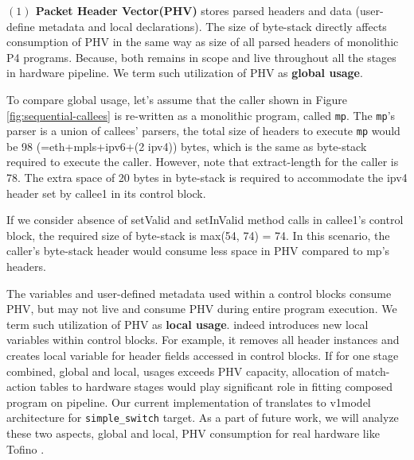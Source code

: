 \documentclass[letterpaper,twocolumn,10pt]{article}
\begin{document}
\textbf{$(1)$ Packet Header Vector(PHV)} stores parsed headers and data (user-define metadata and local declarations).
The size of byte-stack directly affects consumption of PHV in the same way as size of all parsed headers of monolithic P4 programs. 
Because, both remains in scope and live throughout all the stages in hardware pipeline. We term such utilization of PHV as \textbf{global usage}.

To compare global usage, let's assume that the caller shown in Figure \ref{fig:sequential-callees} is re-written as a monolithic program, called \texttt{mp}.
The \texttt{mp}'s parser is a union of callees' parsers, the total size of headers to execute \texttt{mp} would be 98 (=eth+mpls+ipv6+(2 ipv4)) bytes, which is the same as byte-stack required to execute the caller. 
However, note that extract-length for the caller is 78.
The extra space of 20 bytes in byte-stack is required to accommodate the ipv4 header set by callee1 in its control block.

If we consider absence of setValid and setInValid method calls in callee1's control block, the required size of byte-stack is max(54, 74) = 74.
In this scenario, the caller's byte-stack header would consume less space in PHV compared to mp's headers.

The variables and user-defined metadata used within a control blocks consume PHV, but may not live and consume PHV during entire program execution. 
We term such utilization of PHV as \textbf{local usage}. \ucomp indeed introduces new local variables within control blocks. 
For example, it removes all header instances and creates local variable for header fields accessed in control blocks. 
If for one stage combined, global and local, usages exceeds PHV capacity, allocation of match-action tables to hardware stages would play significant role in fitting composed program on pipeline. 
Our current implementation of \ucomp translates to v1model architecture for \texttt{simple\_switch} target. 
As a part of future work, we will analyze these two aspects, global and local, PHV consumption for real hardware like Tofino \cite{tofino}.
\end{document}
